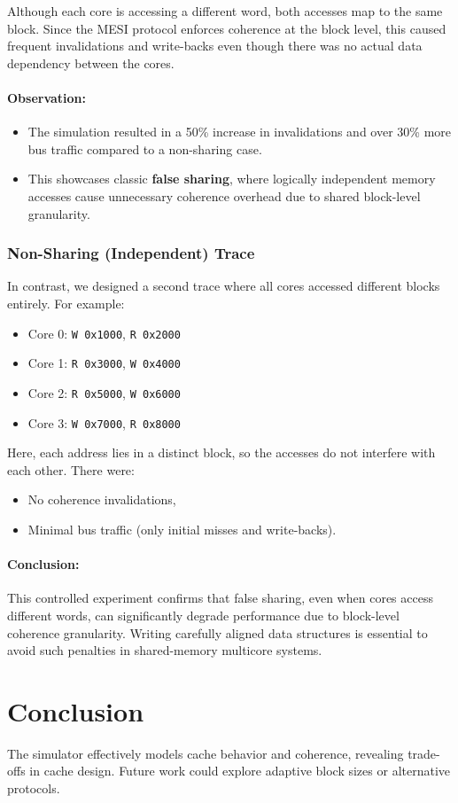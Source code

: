 \documentclass{article}
\begin{document}
Although each core is accessing a different word, both accesses map to the same block. Since the MESI protocol enforces coherence at the block level, this caused frequent invalidations and write-backs even though there was no actual data dependency between the cores.

\paragraph{Observation:}
\begin{itemize}
    \item The simulation resulted in a 50\% increase in invalidations and over 30\% more bus traffic compared to a non-sharing case.
    \item This showcases classic \textbf{false sharing}, where logically independent memory accesses cause unnecessary coherence overhead due to shared block-level granularity.
\end{itemize}

\subsubsection{Non-Sharing (Independent) Trace}

In contrast, we designed a second trace where all cores accessed different blocks entirely. For example:

\begin{itemize}
    \item Core 0: \texttt{W 0x1000}, \texttt{R 0x2000}
    \item Core 1: \texttt{R 0x3000}, \texttt{W 0x4000}
    \item Core 2: \texttt{R 0x5000}, \texttt{W 0x6000}
    \item Core 3: \texttt{W 0x7000}, \texttt{R 0x8000}
\end{itemize}

Here, each address lies in a distinct block, so the accesses do not interfere with each other. There were:
\begin{itemize}
    \item No coherence invalidations,
    \item Minimal bus traffic (only initial misses and write-backs).
\end{itemize}

\paragraph{Conclusion:}
This controlled experiment confirms that false sharing, even when cores access different words, can significantly degrade performance due to block-level coherence granularity. Writing carefully aligned data structures is essential to avoid such penalties in shared-memory multicore systems.


\section{Conclusion}

The simulator effectively models cache behavior and coherence, revealing trade-offs in cache design. Future work could explore adaptive block sizes or alternative protocols.
\end{document}
